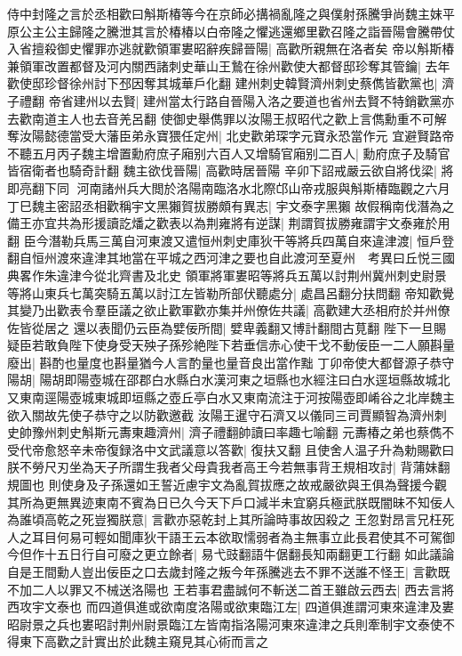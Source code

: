 侍中封隆之言於丞相歡曰斛斯椿等今在京師必搆禍亂隆之與僕射孫騰爭尚魏主妺平原公主公主歸隆之騰泄其言於椿椿以白帝隆之懼逃還鄉里歡召隆之詣晉陽會騰帶仗入省擅殺御史懼罪亦逃就歡領軍婁昭辭疾歸晉陽|{
	高歡所親無在洛者矣}
帝以斛斯椿兼領軍改置都督及河内關西諸刺史華山王鷙在徐州歡使大都督邸珍奪其管鑰|{
	去年歡使邸珍督徐州討下邳因奪其城華戶化翻}
建州刺史韓賢濟州刺史蔡儁皆歡黨也|{
	濟子禮翻}
帝省建州以去賢|{
	建州當太行路自晉陽入洛之要道也省州去賢不特銷歡黨亦去歡南道主人也去音羌呂翻}
使御史舉儁罪以汝陽王叔昭代之歡上言儁勳重不可解奪汝陽懿德當受大藩臣弟永寶猥任定州|{
	北史歡弟琛字元寶永恐當作元}
宜避賢路帝不聽五月丙子魏主增置勳府庶子廂别六百人又增騎官廂别二百人|{
	勳府庶子及騎官皆宿衛者也騎奇計翻}
魏主欲伐晉陽|{
	高歡時居晉陽}
辛卯下詔戒嚴云欲自將伐梁|{
	將即亮翻下同}
河南諸州兵大閲於洛陽南臨洛水北際邙山帝戎服與斛斯椿臨觀之六月丁巳魏主密詔丞相歡稱宇文黑獺賀拔勝頗有異志|{
	宇文泰字黑獺}
故假稱南伐潛為之備王亦宜共為形援讀訖燔之歡表以為荆雍將有逆謀|{
	荆謂賀拔勝雍謂宇文泰雍於用翻}
臣今潛勒兵馬三萬自河東渡又遣恒州刺史庫狄干等將兵四萬自來違津渡|{
	恒戶登翻自恒州渡來違津其地當在平城之西河津之要也自此渡河至夏州　考異曰丘悦三國典畧作朱違津今從北齊書及北史}
領軍將軍婁昭等將兵五萬以討荆州冀州刺史尉景等將山東兵七萬突騎五萬以討江左皆勒所部伏聽處分|{
	處昌呂翻分扶問翻}
帝知歡覺其變乃出歡表令羣臣議之欲止歡軍歡亦集并州僚佐共議|{
	高歡建大丞相府於并州僚佐皆從居之}
還以表聞仍云臣為嬖佞所間|{
	嬖卑義翻又博計翻間古莧翻}
陛下一旦賜疑臣若敢負陛下使身受天殃子孫殄絶陛下若垂信赤心使干戈不動佞臣一二人願斟量廢出|{
	斟酌也量度也斟量猶今人言酌量也量音良出當作黜}
丁卯帝使大都督源子恭守陽胡|{
	陽胡即陽壺城在邵郡白水縣白水漢河東之垣縣也水經注曰白水逕垣縣故城北又東南逕陽壺城東城即垣縣之壺丘亭白水又東南流注于河按陽壺即崤谷之北岸魏主欲入關故先使子恭守之以防歡邀截}
汝陽王暹守石濟又以儀同三司賈顯智為濟州刺史帥豫州刺史斛斯元夀東趣濟州|{
	濟子禮翻帥讀曰率趣七喻翻}
元夀椿之弟也蔡儁不受代帝愈怒辛未帝復録洛中文武議意以答歡|{
	復扶又翻}
且使舍人温子升為勅賜歡曰朕不勞尺刃坐為天子所謂生我者父母貴我者高王今若無事背王規相攻討|{
	背蒲妹翻規圖也}
則使身及子孫還如王誓近慮宇文為亂賀拔應之故戒嚴欲與王俱為聲援今觀其所為更無異迹東南不賓為日已久今天下戶口減半未宜窮兵極武朕既闇昧不知佞人為誰頃高乾之死豈獨朕意|{
	言歡亦惡乾封上其所論時事故因殺之}
王忽對昂言兄枉死人之耳目何易可輕如聞庫狄干語王云本欲取懦弱者為主無事立此長君使其不可駕御今但作十五日行自可廢之更立餘者|{
	易弋豉翻語牛倨翻長知兩翻更工行翻}
如此議論自是王間勳人豈出佞臣之口去歲封隆之叛今年孫騰逃去不罪不送誰不怪王|{
	言歡既不加二人以罪又不械送洛陽也}
王若事君盡誠何不斬送二首王雖啟云西去|{
	西去言將西攻宇文泰也}
而四道俱進或欲南度洛陽或欲東臨江左|{
	四道俱進謂河東來違津及婁昭尉景之兵也婁昭討荆州尉景臨江左皆南指洛陽河東來違津之兵則牽制宇文泰使不得東下高歡之計實出於此魏主窺見其心術而言之}
